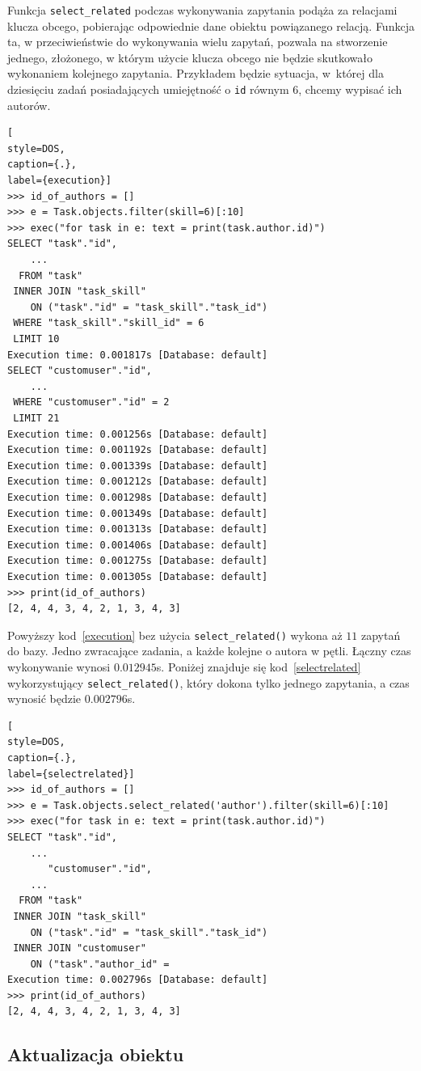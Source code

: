 \documentclass[oneside,polski,logo,indent]{amuthesis}
\begin{document}
Funkcja \texttt{select\_related} podczas wykonywania zapytania podąża za relacjami klucza obcego, pobierając odpowiednie dane obiektu powiązanego relacją.
Funkcja ta, w przeciwieństwie do wykonywania wielu zapytań, pozwala na stworzenie jednego, złożonego, w którym użycie klucza obcego nie będzie skutkowało wykonaniem kolejnego zapytania. Przykładem będzie sytuacja, w~której dla dziesięciu zadań posiadających umiejętność o \texttt{id} równym 6, chcemy wypisać ich autorów.
\begin{lstlisting}[
style=DOS,
caption={.},
label={execution}]
>>> id_of_authors = []
>>> e = Task.objects.filter(skill=6)[:10]
>>> exec("for task in e: text = print(task.author.id)")
SELECT "task"."id",
	...
  FROM "task"
 INNER JOIN "task_skill"
    ON ("task"."id" = "task_skill"."task_id")
 WHERE "task_skill"."skill_id" = 6
 LIMIT 10
Execution time: 0.001817s [Database: default]
SELECT "customuser"."id",
	...
 WHERE "customuser"."id" = 2
 LIMIT 21
Execution time: 0.001256s [Database: default]
Execution time: 0.001192s [Database: default]
Execution time: 0.001339s [Database: default]
Execution time: 0.001212s [Database: default]
Execution time: 0.001298s [Database: default]
Execution time: 0.001349s [Database: default]
Execution time: 0.001313s [Database: default]
Execution time: 0.001406s [Database: default]
Execution time: 0.001275s [Database: default]
Execution time: 0.001305s [Database: default]
>>> print(id_of_authors)
[2, 4, 4, 3, 4, 2, 1, 3, 4, 3]
\end{lstlisting}
Powyższy kod~\ref{execution} bez użycia \texttt{select\_related()} wykona aż $11$ zapytań do bazy. Jedno zwracające zadania, a każde kolejne o autora w pętli. Łączny czas wykonywanie wynosi $0.012945$s. Poniżej znajduje się kod~\ref{selectrelated} wykorzystujący \texttt{select\_related()}, który dokona tylko jednego zapytania, a czas wynosić będzie $0.002796$s.
\begin{lstlisting}[
style=DOS,
caption={.},
label={selectrelated}]
>>> id_of_authors = []
>>> e = Task.objects.select_related('author').filter(skill=6)[:10]
>>> exec("for task in e: text = print(task.author.id)")
SELECT "task"."id",
	...
       "customuser"."id",
	...
  FROM "task"
 INNER JOIN "task_skill"
    ON ("task"."id" = "task_skill"."task_id")
 INNER JOIN "customuser"
    ON ("task"."author_id" =
Execution time: 0.002796s [Database: default]
>>> print(id_of_authors)
[2, 4, 4, 3, 4, 2, 1, 3, 4, 3]
\end{lstlisting}

\begin{center}
\subsection{Aktualizacja obiektu}
\end{center}
\end{document}
